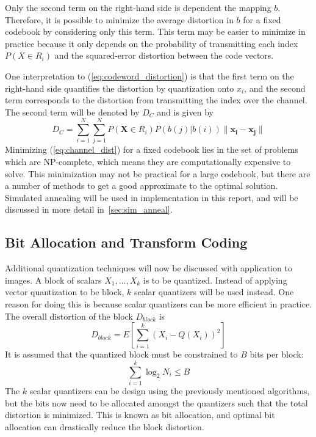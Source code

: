 \documentclass[10pt]{article}
\begin{document}
Only the second term on the right-hand side is dependent the mapping $b$. Therefore, it is possible to minimize the average distortion in $b$ for a fixed codebook by considering only this term. This term may be easier to minimize in practice because it only depends on the probability of transmitting each index $P(X \in R_i)$ and the squared-error distortion between the code vectors.

One interpretation to (\ref{eq:codeword_distortion}) is that the first term on the right-hand side quantifies the distortion by quantization onto $x_i$, and the second term corresponds to the distortion from transmitting the index over the channel. The second term will be denoted by $D_C$ and is given by
\begin{equation}
  \label{eq:channel_dist}
D_C = \sum_{i=1}^N \sum_{j=1}^N P(\mathbf{X} \in R_i) P(b(j)|b(i)) \|\mathbf{x_i} - \mathbf{x_j}\|
\end{equation}
Minimizing (\ref{eq:channel_dist}) for a fixed codebook lies in the set of problems which are NP-complete, which means they are computationally expensive to solve. This minimization may not be practical for a large codebook, but there are a number of methods to get a good approximate to the optimal solution. Simulated annealing will be used in implementation in this report, and will be discussed in more detail in~\ref{sec:sim_anneal}.

\subsection{Bit Allocation and Transform Coding}
\label{sec:bit_alloc}
Additional quantization techniques will now be discussed with application to images. A block of scalars $X_1,\ldots,X_k$ is to be quantized. Instead of applying vector quantization to be block, $k$ scalar quantizers will be used instead. One reason for doing this is because scalar quantizers can be more efficient in practice. The overall distortion of the block $D_{block}$ is
\begin{equation}
D_{block} = E\left[\sum_{i=1}^k(X_i - Q(X_i))^2\right]
\end{equation}
It is assumed that the quantized block must be constrained to $B$ bits per block:
\begin{equation}
\sum_{i=1}^k \log_2 N_i \le B
\end{equation}
The $k$ scalar quantizers can be design using the previously mentioned algorithms, but the bits now need to be allocated amongst the quantizers such that the total distortion is minimized. This is known as bit allocation, and optimal bit allocation can drastically reduce the block distortion.
\end{document}
